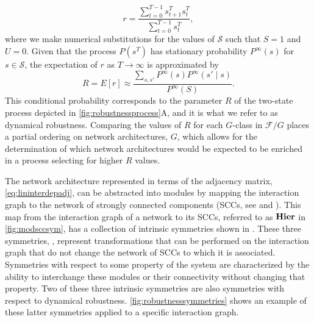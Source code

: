 $$
r = \frac{\sum_{t=0}^{T-1}s_{t+1}^T s_{t}^T}{\sum_{t=0}^{T-1} s_{t}^T},
$$
where we make numerical substitutions for the values of $\mathcal{S}$ such that $S = 1$ and $U = 0$.
Given that the process $P(s^T)$ has stationary probability $P^{\infty}(s)$ for $s \in \mathcal{S}$, the expectation of $r$ as $T \rightarrow \infty$ is approximated by
$$
R = E[r] \approx \frac{\sum_{s,s'} P^{\infty}(s)P^{\infty}(s' \mid s)}{P^{\infty}(S)}.
$$
This conditional probability corresponds to the parameter $R$ of the two-state process depicted in \ref{fig:robustnessprocess}A, and it is what we refer to as dynamical robustness. Comparing the values of $R$ for each $G$-class in $\mathcal{F}/G$ places a partial ordering on network architectures, $G$, which allows for the determination of which network architectures would be expected to be enriched in a process selecting for higher $R$ values.

The network architecture represented in terms of the adjacency matrix, \ref{eq:lininterdepadj}, can be abstracted into modules by mapping the interaction graph to the network of strongly connected components (SCCs, see  and ). This map from the interaction graph of a network to its SCCs, referred to as $\mathbf{Hier}$ in \ref{fig:modsccsym}, has a collection of intrinsic symmetries shown in . These three symmetries, , represent transformations that can be performed on the interaction graph that do not change the network of SCCs to which it is associated. Symmetries with respect to some property of the system are characterized by the ability to interchange these modules or their connectivity without changing that property. Two of these three intrinsic symmetries are also symmetries with respect to dynamical robustness. \ref{fig:robustnesssymmetries} shows an example of these latter symmetries applied to a specific interaction graph.

